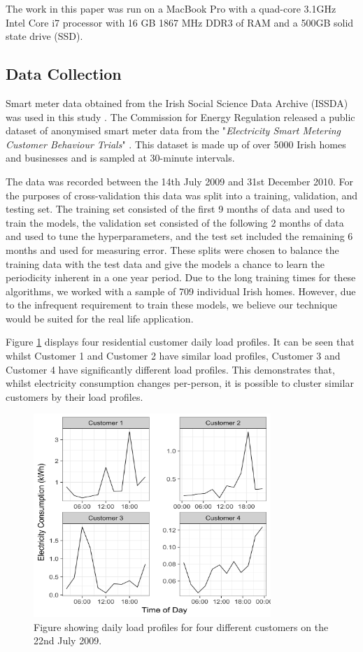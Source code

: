 The work in this paper was run on a MacBook Pro with a quad-core 3.1GHz Intel Core i7 processor with 16 GB 1867 MHz DDR3 of RAM and a 500GB solid state drive (SSD).

\subsection{Data Collection}

Smart meter data obtained from the Irish Social Science Data Archive (ISSDA) was used in this study \cite{cer_2012}. The Commission for Energy Regulation released a public dataset of anonymised smart meter data from the "\textit{Electricity Smart Metering Customer Behaviour Trials}" \cite{setis}. This dataset is made up of over 5000 Irish homes and businesses and is sampled at 30-minute intervals.

The data was recorded between the 14th July 2009 and 31st December 2010. For the purposes of cross-validation this data was split into a training, validation, and testing set. The training set consisted of the first 9 months of data and used to train the models, the validation set consisted of the following 2 months of data and used to tune the hyperparameters, and the test set included the remaining 6 months and used for measuring error. These splits were chosen to balance the training data with the test data and give the models a chance to learn the periodicity inherent in a one year period. Due to the long training times for these algorithms, we worked with a sample of 709 individual Irish homes. However, due to the infrequent requirement to train these models, we believe our technique would be suited for the real life application.

Figure \ref{fig:similar_customers} displays four residential customer daily load profiles. It can be seen that whilst Customer 1 and Customer 2 have similar load profiles, Customer 3 and Customer 4 have significantly different load profiles.  This demonstrates that, whilst electricity consumption changes per-person, it is possible to cluster similar customers by their load profiles.
\begin{figure}[b]
	\includegraphics[width=0.8\textwidth]{Chapter5/figures/short-term-forecasting/Webp_net-resizeimage.png}
	\caption{Figure showing daily load profiles for four different customers on the 22nd July 2009.}
	\label{fig:similar_customers}
\end{figure}
